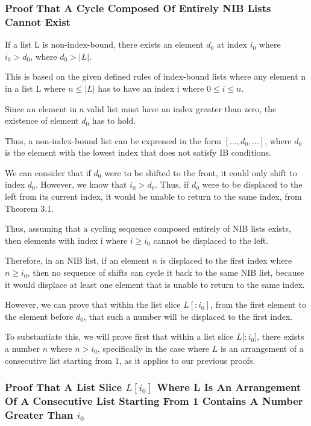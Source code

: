 \documentclass[12pt]{article}
\begin{document}
\subsubsection{Proof That A Cycle Composed Of Entirely NIB Lists Cannot Exist}

If a list L is non-index-bound, there exists an element $d_0$ at index $i_0$ where $i_0>d_0$, where $d_0>|L|$.

This is based on the given defined rules of index-bound lists where any element n in a list L where $n \leq |L|$ has to have an index i where $0 \leq i \leq n$.

Since an element in a valid list must have an index greater than zero, the existence of element $d_0$ has to hold.

Thus, a non-index-bound list can be expressed in the form $[..., d_0, ...]$, where $d_0$ is the element with the lowest index that does not satisfy IB conditions.

We can consider that if $d_0$ were to be shifted to the front, it could only shift to index $d_0$. However, we know that $i_0>d_0$. Thus, if $d_0$ were to be displaced to the left from its current index, it would be unable to return to the same index, from Theorem 3.1.

Thus, assuming that a cycling sequence composed entirely of NIB lists exists, then elements with index i where $i \geq i_0$ cannot be displaced to the left.

Therefore, in an NIB list, if an element $n$ is displaced to the first index where $n \geq i_0$, then no sequence of shifts can cycle it back to the same NIB list, because it would displace at least one element that is unable to return to the same index.

However, we can prove that within the list slice $L[:i_0]$, from the first element to the element before $d_0$, that such a number will be displaced to the first index.

To substantiate this, we will prove first that within a list slice $L[:i_0$], there exists a number $n$ where $n>i_0$, specifically in the case where $L$ is an arrangement of a consecutive list starting from 1, as it applies to our previous proofs.

\subsubsection{Proof That A List Slice $L[i_0]$ Where L Is An Arrangement Of A Consecutive List Starting From 1 Contains A Number Greater Than $i_0$}
\end{document}
